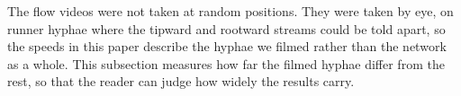 The flow videos were not taken at random positions.
They were taken by eye, on runner hyphae where the tipward and rootward streams could be told apart, so the speeds in this paper describe the hyphae we filmed rather than the network as a whole.
This subsection measures how far the filmed hyphae differ from the rest, so that the reader can judge how widely the results carry.


